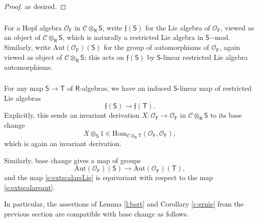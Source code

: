 \documentclass{amsart}
\theoremstyle{definition}
\newcommand{\OOF}{\OO_{\mathsf{F}}}
\newcommand{\lmod}{\on{-mod}}
\newcommand{\sC}{\mathscr{C}}
\newcommand{\sss}{\subsubsection{}}
\newcommand{\Sing}{\mathsf{S}}
\newcommand{\Ting}{\mathsf{T}}
\newcommand{\OO}{\mathscr{O}}
\newcommand{\Hom}{\on{Hom}}
\newcommand{\on}{\mathrm}
\newcommand{\Ring}{\mathsf{R}}
\newcommand{\F}{\mathbb{F}}
\newcommand{\ff}{\mathfrak{f}}
\numberwithin{equation}{section}
\begin{document}
{\begin{proof}
as desired.    
\end{proof}


}

\iffalse 
\sss For a Hopf algebra $\OOF$ in $\sC \otimes_\Ring \Sing$, write $\ff(\Sing)$ for the Lie algebra of $\OOF$, viewed as an object of $\sC \otimes_\Ring \Sing$, which is naturally a restricted Lie algebra in $\Sing\lmod$. Similarly, write $\on{Aut}(\OOF)(\Sing)$ for the group of automorphisms of $\OOF$, again viewed as object of $\sC \otimes_\Ring \Sing$; this acts on $\ff(\Sing)$ by $\Sing$-linear restricted Lie algebra automorphisms. 


\sss For any map $\Sing \rightarrow \Ting$ of $\Ring$-algebras, we have an induced $\Sing$-linear map of restricted Lie algebras
\begin{equation} \label{e:extscalarsLie}\ff(\Sing) \rightarrow \ff(\Ting). \end{equation}
Explicitly, this sends an invariant derivation $X: \OOF \rightarrow \OOF$ in $\sC \otimes_\Ring \Sing$ to its base change $$X \otimes_\Sing 1 \in \Hom_{\sC \otimes_\Ring \Ting}(\OOF, \OOF),$$which is again an invariant derivation. 


Similarly, base change gives a map of groups 
\begin{equation} \label{e:extscalarsaut}\on{Aut}(\OOF)(\Sing) \rightarrow \on{Aut}(\OOF)(\Ting),\end{equation}
and the map \eqref{e:extscalarsLie} is  equivariant with respect to the map \eqref{e:extscalarsaut}. 



In particular, the assertions of Lemma \ref{l:bert} and Corollary \ref{c:ernie} from the previous section are compatible with base change as follows. 
\end{document}
